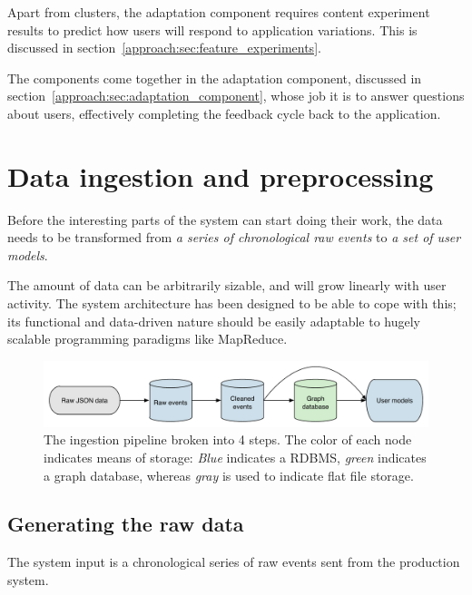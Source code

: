 Apart from clusters, the adaptation component requires content experiment results to predict how users will respond to application variations. This is discussed in section~\ref{approach:sec:feature_experiments}.

The components come together in the adaptation component, discussed in section~\ref{approach:sec:adaptation_component}, whose job it is to answer questions about users, effectively completing the feedback cycle back to the application.


\section{Data ingestion and preprocessing} %
\label{approach:sec:data_ingestion_and_preprocessing}

Before the interesting parts of the system can start doing their work, the data needs to be transformed from \emph{a series of chronological raw events} to \emph{a set of user models}.

The amount of data can be arbitrarily sizable, and will grow linearly with user activity. The system architecture has been designed to be able to cope with this; its functional and data-driven nature should be easily adaptable to hugely scalable programming paradigms like MapReduce.

\begin{figure}[h]
  \centering
    \includegraphics[width=\textwidth]{Figures/ingestion-pipeline}
  \caption{The ingestion pipeline broken into 4 steps. The color of each node indicates means of storage: \emph{Blue} indicates a RDBMS, \emph{green} indicates a graph database, whereas \emph{gray} is used to indicate flat file storage.}
  \label{fig:ingestion-pipeline}
\end{figure}

\subsection{Generating the raw data}
\label{approach:sub:generating_data}

The system input is a chronological series of raw events sent from the production system.

